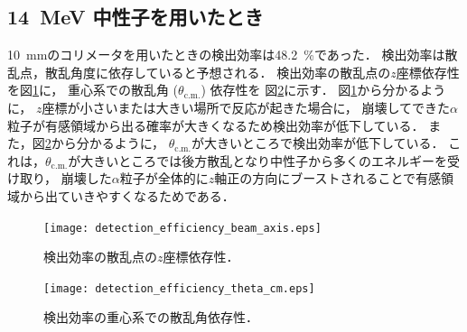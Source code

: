 \documentclass[../master]{subfiles}
\begin{document}
\subsection{14~MeV 中性子を用いたとき}
\SI{10}{\milli\metre}のコリメータを用いたときの検出効率は\SI{48.2}{\percent}であった．
検出効率は散乱点，散乱角度に依存していると予想される．
検出効率の散乱点の$z$座標依存性を図\ref{fig::detection_efficiency_beam_axis}に，
重心系での散乱角 ($\theta_{\text{c.m.}}$) 依存性を
図\ref{fig::detection_efficiency_theta_cm}に示す．
図\ref{fig::detection_efficiency_beam_axis}から分かるように，
$z$座標が小さいまたは大きい場所で反応が起きた場合に，
崩壊してできた$\alpha$粒子が有感領域から出る確率が大きくなるため検出効率が低下している．
また，図\ref{fig::detection_efficiency_theta_cm}から分かるように，
$\theta_{\text{c.m.}}$が大きいところで検出効率が低下している．
これは，$\theta_{\text{c.m.}}$が大きいところでは後方散乱となり中性子から多くのエネルギーを受け取り，
崩壊した$\alpha$粒子が全体的に$z$軸正の方向にブーストされることで有感領域から出ていきやすくなるためである．
\begin{figure}
  \centering
  \texttt{[image: detection\_efficiency\_beam\_axis.eps]}
  \caption{検出効率の散乱点の$z$座標依存性．}
  \label{fig::detection_efficiency_beam_axis}
\end{figure}
\begin{figure}
  \centering
  \texttt{[image: detection\_efficiency\_theta\_cm.eps]}
  \caption{検出効率の重心系での散乱角依存性．}
  \label{fig::detection_efficiency_theta_cm}
\end{figure}
\end{document}
